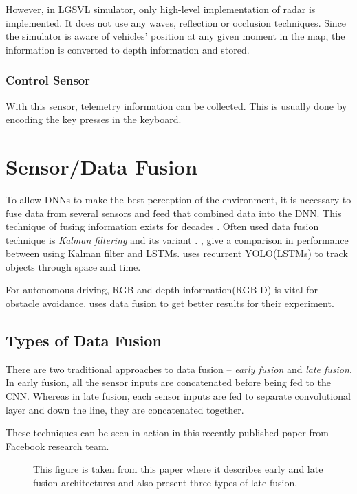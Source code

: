 However, in LGSVL simulator, only high-level implementation of radar is implemented. It
does not use any waves, reflection or occlusion techniques. Since the simulator is aware
of vehicles' position at any given moment in the map, the information is converted to
depth information and stored.

\subsubsection*{Control Sensor}
With this sensor, telemetry information can be collected. This is usually done by
encoding the key presses in the keyboard.

\section{Sensor/Data Fusion}
\label{sec:datafusion}
To allow DNNs to make the best perception of the environment, it is necessary to fuse data from
several sensors and feed that combined data into the DNN. This technique of fusing
information exists for decades \cite{Datafusion1}. Often used data fusion technique is
\textit{Kalman filtering} and its variant \cite{Datafusion3} \cite{Datafusion2}. \cite{kalmanfilterpaper1},
\cite{kalmanfilterpaper2} give a comparison in performance between using Kalman filter and
LSTMs. \cite{kalmanfilterpaper3} uses recurrent YOLO(LSTMs) to track objects through space and time.

For autonomous driving, RGB and depth information(RGB-D) is vital for obstacle avoidance.
\cite{XiaoCodevillaMultimodalE2E} uses data fusion to get better results for their
experiment.
\subsection{Types of Data Fusion}
There are two traditional approaches to data fusion -- \textit{early fusion} and
\textit{late fusion}.
In early fusion, all the sensor inputs are concatenated before being fed to the CNN.
Whereas in late fusion, each sensor inputs are fed to separate convolutional layer and
down the line, they are concatenated together.

These techniques can be seen in action in this \cite{wang2020makes} recently
published paper from Facebook research team.
\begin{figure}[!ht]
	\begin{center}
        \def\svgwidth{\textwidth}
        
	\end{center}
    \caption{This figure is taken from this \cite{Datafusion4} paper where it describes early and
        late fusion architectures and also present three types of late fusion.}
    \label{fig:Datafusiontypes}
\end{figure}


